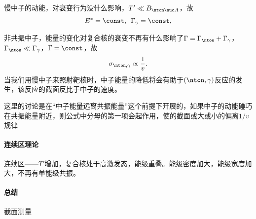 慢中子的动能，对衰变行为没什么影响，$T'\ll B_{\nton\nuc A}$，故
\[
	E^\ast=\const,\enspace\Gamma_\gamma=\const,
\]

非共振中子，能量的变化对复合核的衰变不再有什么影响了$\Gamma=\Gamma_\nton+\Gamma_\gamma$，$\Gamma_\nton\ll\Gamma_\gamma$，$\Gamma=\const$，故
\begin{align}
	\label{slow-neutron}
	\sigma_{\nton,\gamma}\propto\frac1v.
\end{align}
当我们用慢中子来照射靶核时，中子能量的降低将会有助于$(\nton,\gamma)$反应的发生，该反应的截面反比于中子的速度。

这里的讨论是在“中子能量远离共振能量”这个前提下开展的，如果中子的动能碰巧在共振能量附近，则公式中分母的第一项会起作用，使的截面或大或小的偏离$1/v$规律
\paragraph{连续区理论}连续区——$T'$增加，复合核处于高激发态，能级重叠。能级密度加大，能级宽度加大，不再有单能级共振。
\paragraph{总结}截面测量

